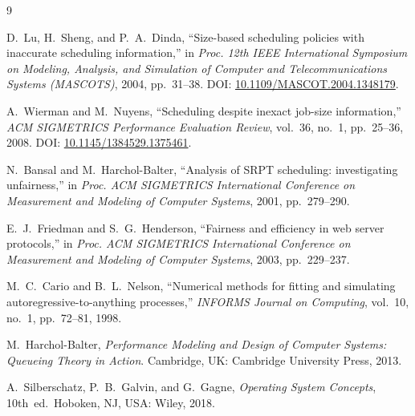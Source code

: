 \documentclass[11pt]{article}
\begin{document}
\begin{thebibliography}{9}
\small
\setlength{\itemsep}{0.2em}
\setlength{\parsep}{0pt}

D.~Lu, H.~Sheng, and P.~A.~Dinda, ``Size-based scheduling policies with inaccurate scheduling information,'' in \textit{Proc. 12th IEEE International Symposium on Modeling, Analysis, and Simulation of Computer and Telecommunications Systems (MASCOTS)}, 2004, pp.~31--38. DOI: \url{10.1109/MASCOT.2004.1348179}.

A.~Wierman and M.~Nuyens, ``Scheduling despite inexact job-size information,'' \textit{ACM SIGMETRICS Performance Evaluation Review}, vol.~36, no.~1, pp.~25--36, 2008. DOI: \url{10.1145/1384529.1375461}.

N.~Bansal and M.~Harchol-Balter, ``Analysis of SRPT scheduling: investigating unfairness,'' in \textit{Proc. ACM SIGMETRICS International Conference on Measurement and Modeling of Computer Systems}, 2001, pp.~279--290.

E.~J.~Friedman and S.~G.~Henderson, ``Fairness and efficiency in web server protocols,'' in \textit{Proc. ACM SIGMETRICS International Conference on Measurement and Modeling of Computer Systems}, 2003, pp.~229--237.

M.~C.~Cario and B.~L.~Nelson, ``Numerical methods for fitting and simulating autoregressive-to-anything processes,'' \textit{INFORMS Journal on Computing}, vol.~10, no.~1, pp.~72--81, 1998.

M.~Harchol-Balter, \textit{Performance Modeling and Design of Computer Systems: Queueing Theory in Action}. Cambridge, UK: Cambridge University Press, 2013.

A.~Silberschatz, P.~B.~Galvin, and G.~Gagne, \textit{Operating System Concepts}, 10th~ed.\ Hoboken, NJ, USA: Wiley, 2018.

\end{thebibliography}
\end{document}

